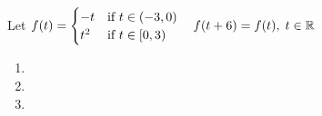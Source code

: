 Let $f(t) = \begin{cases}
    -t & \text{if } t \in (-3, 0)\\
    t^2 & \text{if } t \in [0,3)
\end{cases} \quad f(t+6) = f(t),\; t\in \mathbb{R}$

\begin{enumerate}
\item 
\item 
\item 
\end{enumerate}
